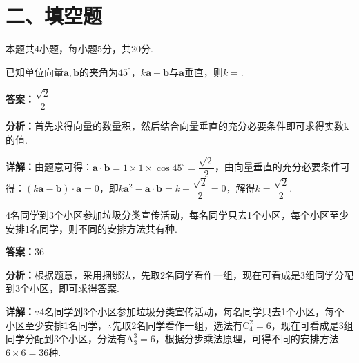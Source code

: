 \section*{二、填空题}
本题共4小题，每小题5分，共20分.

\begin{question}[points=5]
已知单位向量$\boldsymbol{a},\boldsymbol{b}$的夹角为$45^\circ$，$k\boldsymbol{a}-\boldsymbol{b}$与$\boldsymbol{a}$垂直，则$k=$.
\begin{solution}
\textbf{答案：}$\dfrac{\sqrt2}{2}$

\textbf{分析：}首先求得向量的数量积，然后结合向量垂直的充分必要条件即可求得实数k的值.

\textbf{详解：}由题意可得：$\boldsymbol{a}\cdot\boldsymbol{b}=1\times1\times\cos45^\circ=\dfrac{\sqrt2}{2}$，由向量垂直的充分必要条件可得：$(k\boldsymbol{a}-\boldsymbol{b})\cdot\boldsymbol{a}=0$，即$k\boldsymbol{a}^2-\boldsymbol{a}\cdot\boldsymbol{b}=k-\dfrac{\sqrt2}{2}=0$，解得$k=\dfrac{\sqrt2}{2}$.
\end{solution}
\end{question}

\begin{question}[points=5]
4名同学到3个小区参加垃圾分类宣传活动，每名同学只去1个小区，每个小区至少安排1名同学，则不同的安排方法共有种.
\fillin[{$36$}]
\begin{solution}
\textbf{答案：}$36$

\textbf{分析：}根据题意，采用捆绑法，先取2名同学看作一组，现在可看成是3组同学分配到3个小区，即可求得答案.

\textbf{详解：}$\because$4名同学到3个小区参加垃圾分类宣传活动，每名同学只去1个小区，每个小区至少安排1名同学，$\therefore$先取2名同学看作一组，选法有$\mathrm{C}_4^2=6$，现在可看成是3组同学分配到3个小区，分法有$\mathrm{A}_3^3=6$，根据分步乘法原理，可得不同的安排方法$6\times6=36$种.
\end{solution}
\end{question}

